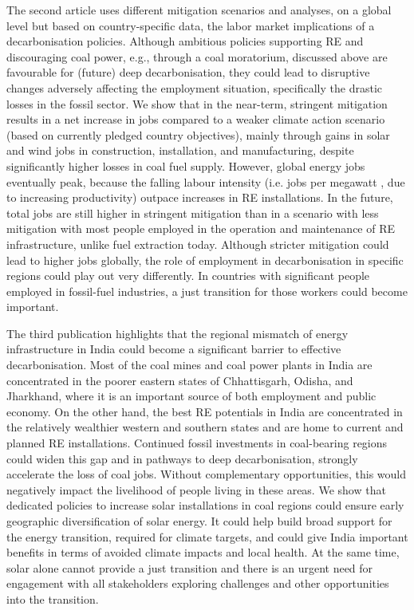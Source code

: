 \documentclass[../thesis.tex]{subfiles}
\begin{document}
The second article uses %
different mitigation scenarios and analyses, on a global level but based on country-specific data, the labor market implications of a decarbonisation policies. Although ambitious policies supporting RE and discouraging coal power, e.g., through a coal moratorium, %
discussed above are favourable for (future) deep decarbonisation, they could lead to disruptive changes adversely affecting the employment situation, specifically the drastic losses in the fossil sector. We show that in the near-term, stringent mitigation results in a net increase in jobs compared to a weaker climate action scenario (based on currently pledged country objectives), mainly through gains in solar and wind jobs in construction, installation, and manufacturing, despite significantly higher losses in coal fuel supply. However, global energy jobs eventually peak, because the falling labour intensity (i.e. jobs per megawatt %
, due to increasing productivity) outpace %
 increases in RE installations. In the future, total jobs are still higher in stringent mitigation %
 than in a scenario with less mitigation with most people employed in the operation and maintenance of RE infrastructure, unlike fuel extraction today.  Although stricter mitigation could lead to higher jobs globally, the role of employment in decarbonisation in specific regions could play out very differently. In countries with significant people employed in fossil-fuel industries, a just transition for those workers could become important. 

The third publication highlights that the regional mismatch of energy infrastructure in India could become a significant barrier to effective decarbonisation. Most of the coal mines and coal power plants in India are concentrated in the poorer eastern states of Chhattisgarh, Odisha, and Jharkhand, where it is an important source of both employment and public economy. On the other hand, the best RE potentials in India are concentrated in the relatively wealthier  %
western and southern states and are home to current and planned RE installations.  Continued fossil investments in coal-bearing regions could widen this gap and in pathways to deep decarbonisation, strongly accelerate the loss of coal jobs. Without complementary opportunities, this would negatively impact the livelihood of people living in these areas. We show that dedicated policies to increase solar installations in coal regions could ensure early geographic diversification of solar energy. It could help build broad support for the energy transition, required for climate targets, and could give India important benefits in terms of avoided climate impacts and local health. At the same time, solar alone cannot provide a just transition and there is an urgent need for engagement with all stakeholders exploring challenges and other opportunities into the transition. 
\end{document}
